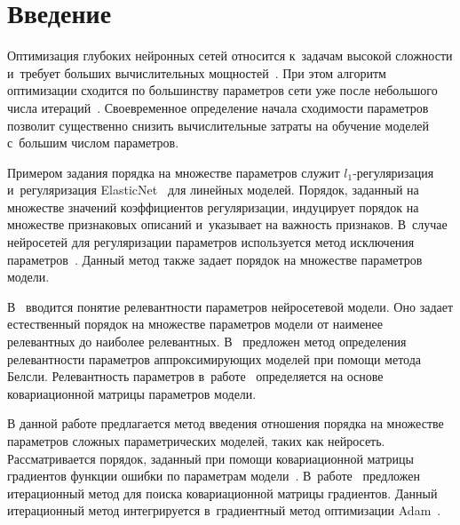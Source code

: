  



\thispagestyle{headings}

\begin{multicols}{2}

\label{st\stat}



\section{Введение}

Оптимизация глубоких нейронных сетей относится к~задачам высокой 
сложности и~требует больших вычислительных 
мощностей~\cite{sutskever2014}. При этом алгоритм оптимизации сходится по 
большинству параметров сети уже после небольшого числа 
итераций~\cite{Chunyan2016}. Своевременное определение начала сходимости 
параметров позволит существенно снизить вычислительные затраты на 
обучение моделей с~большим числом параметров.

Примером задания порядка на множестве параметров служит 
$l_1$-ре\-гу\-ля\-ри\-за\-ция~\cite{Tibshirani1996} и~регуляризация 
ElasticNet~\cite{Hastie2005} для линейных моделей. Порядок, заданный на 
множестве значений коэффициентов регуляризации, индуцирует порядок на 
множестве признаковых описаний и~указывает на важность признаков.
В~случае нейросетей для регуляризации параметров используется метод 
исключения параметров~\cite{srivastava2014, molchanov2017}. Данный метод 
также задает порядок на множестве параметров модели.

В~\cite{cun1990} вводится понятие релевантности па\-ра\-мет\-ров нейросетевой 
модели. Оно задает естественный порядок на множестве параметров модели от 
наименее релевантных до наиболее релевантных. В~\cite{grabovoy2019} 
предложен метод определения релевантности параметров аппроксимирующих 
моделей при помощи метода Белсли. Релевантность параметров 
в~работе~\cite{grabovoy2019} определяется на основе ковариационной 
матрицы параметров модели.

В данной работе предлагается метод введения отношения порядка на 
множестве па\-ра\-мет\-ров сложных параметрических моделей, таких как 
нейросеть. Рассматривается порядок, заданный при помощи ковариационной 
матрицы градиентов функции ошибки по параметрам модели~\cite{Mandt2017}. 
В~работе~\cite{Chunyan2016} предложен итерационный метод для поиска 
ковариационной матрицы градиентов. Данный итерационный метод 
интегрируется в~градиентный метод оптимизации Adam~\cite{Kingma2014}.


\end{multicols}
